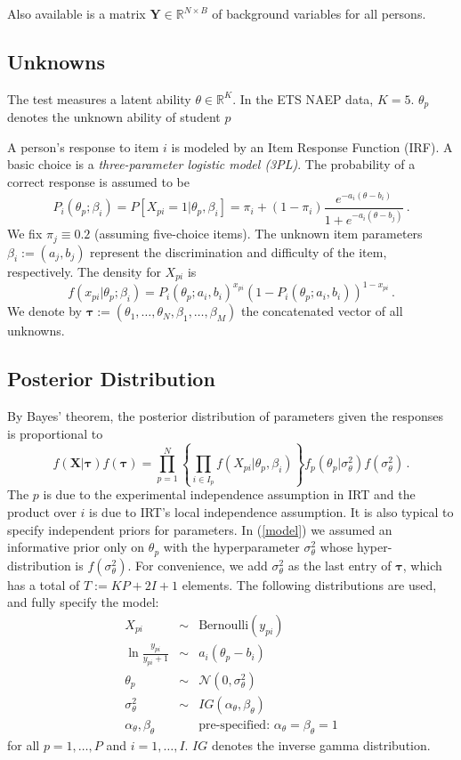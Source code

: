 \documentclass{article}
\newcommand{\Normal}{\mathcal{N}}
\newcommand{\R}{\mathbb{R}}
\newcommand{\bX}{\mathbf{X}}
\newcommand{\bY}{\mathbf{Y}}
\newcommand{\bt}{\boldsymbol\tau}
\newcommand{\st}{\sigma_{\ta}^2}
\newcommand{\ta}{\theta}
\begin{document}
Also available is a matrix $\bY \in \R^{N \times B}$ of background variables for all persons.

\subsection{Unknowns}
The test measures a latent ability $\ta \in \R^K$. In the ETS NAEP data, $K=5$. $\ta_p$ denotes the unknown ability of student $p$

A person's response to item $i$ is modeled by an Item Response Function (IRF). A basic choice is a {\it three-parameter logistic model (3PL)}. The probability of a correct response is assumed to be
\begin{equation}
  P_i(\ta_p; \beta_i) = P[X_{pi} = 1 | \ta_p,\beta_i] = \pi_i + (1-\pi_i) \frac{e^{-a_i (\ta - b_i)}}{1 + e^{-a_i (\ta - b_j)}}\,.
\end{equation}
We fix $\pi_j \equiv 0.2$ (assuming five-choice items). The unknown item parameters $\beta_i := (a_j, b_j)$ represent the discrimination and difficulty of the item, respectively. The density for $X_{pi}$ is
\begin{equation}
  f(x_{pi}|\ta_p;\beta_i) = P_i(\ta_p;a_i,b_i)^{x_{pi}} \left(1 - P_i(\ta_p;a_i,b_i)\right)^{1-x_{pi}}\,.
\end{equation}
We denote by $\bt := (\ta_1, \dots, \ta_N, \beta_1, \dots, \beta_M)$ the concatenated vector of all unknowns.

\subsection{Posterior Distribution}
By Bayes' theorem, the posterior distribution of parameters given the responses is proportional to
\begin{equation}
  f(\bX|\bt) f(\bt) = \prod_{p=1}^N \left\{ \prod_{i \in I_p} f(X_{pi}|\ta_p,\beta_i) \right\} f_p(\ta_p|\st) f(\st)\,.
  \label{model}
\end{equation}
The $p$ is due to the experimental independence assumption in IRT and the product over $i$ is due to IRT’s local independence assumption. It is also typical to specify independent priors for parameters. In (\ref{model}) we assumed an informative prior only on $\ta_p$ with the hyperparameter $\st$ whose hyper-distribution is $f(\st)$. For convenience, we add $\st$ as the last entry of $\bt$, which has a total of $T := K P + 2 I + 1$ elements. The following distributions are used, and fully specify the model:
\begin{eqnarray}
	X_{pi} &\sim& {\mbox{Bernoulli}}(y_{pi})
	\label{dist_x} \\
	\ln \frac{y_{pi}}{y_{pi}+1} &\sim& a_i (\ta_p - b_i)
	\label{dist_y} \\
	\ta_p &\sim& \Normal(0, \st)
	\label{dist_ta} \\
	\st &\sim& IG(\alpha_{\ta}, \beta_{\ta})
	\label{dist_st} \\
	\alpha_{\ta}, \beta_{\ta} && {\mbox{pre-specified: }} \alpha_{\ta} = \beta_{\ta} = 1
	\label{dist_ab}
\end{eqnarray}
for all $p=1,\dots,P$ and $i=1,\dots,I$. $IG$ denotes the inverse gamma distribution.
\end{document}
